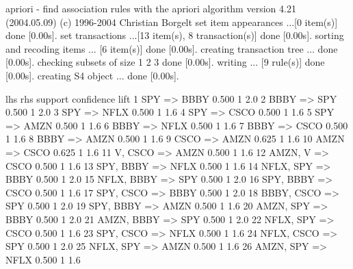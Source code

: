 \documentclass{article}
\begin{document}
\begin{Schunk}
\begin{Soutput}
apriori - find association rules with the apriori algorithm
version 4.21 (2004.05.09)        (c) 1996-2004   Christian Borgelt
set item appearances ...[0 item(s)] done [0.00s].
set transactions ...[13 item(s), 8 transaction(s)] done [0.00s].
sorting and recoding items ... [6 item(s)] done [0.00s].
creating transaction tree ... done [0.00s].
checking subsets of size 1 2 3 done [0.00s].
writing ... [9 rule(s)] done [0.00s].
creating S4 object  ... done [0.00s].
\end{Soutput}
\begin{Soutput}
   lhs       rhs    support confidence lift
1  {SPY}  => {BBBY}   0.500          1  2.0
2  {BBBY} => {SPY}    0.500          1  2.0
3  {SPY}  => {NFLX}   0.500          1  1.6
4  {SPY}  => {CSCO}   0.500          1  1.6
5  {SPY}  => {AMZN}   0.500          1  1.6
6  {BBBY} => {NFLX}   0.500          1  1.6
7  {BBBY} => {CSCO}   0.500          1  1.6
8  {BBBY} => {AMZN}   0.500          1  1.6
9  {CSCO} => {AMZN}   0.625          1  1.6
10 {AMZN} => {CSCO}   0.625          1  1.6
11 {V,                                     
    CSCO} => {AMZN}   0.500          1  1.6
12 {AMZN,                                  
    V}    => {CSCO}   0.500          1  1.6
13 {SPY,                                   
    BBBY} => {NFLX}   0.500          1  1.6
14 {NFLX,                                  
    SPY}  => {BBBY}   0.500          1  2.0
15 {NFLX,                                  
    BBBY} => {SPY}    0.500          1  2.0
16 {SPY,                                   
    BBBY} => {CSCO}   0.500          1  1.6
17 {SPY,                                   
    CSCO} => {BBBY}   0.500          1  2.0
18 {BBBY,                                  
    CSCO} => {SPY}    0.500          1  2.0
19 {SPY,                                   
    BBBY} => {AMZN}   0.500          1  1.6
20 {AMZN,                                  
    SPY}  => {BBBY}   0.500          1  2.0
21 {AMZN,                                  
    BBBY} => {SPY}    0.500          1  2.0
22 {NFLX,                                  
    SPY}  => {CSCO}   0.500          1  1.6
23 {SPY,                                   
    CSCO} => {NFLX}   0.500          1  1.6
24 {NFLX,                                  
    CSCO} => {SPY}    0.500          1  2.0
25 {NFLX,                                  
    SPY}  => {AMZN}   0.500          1  1.6
26 {AMZN,                                  
    SPY}  => {NFLX}   0.500          1  1.6

\end{Soutput}
\end{Schunk}
\end{document}
